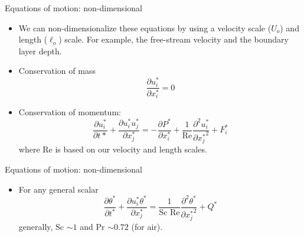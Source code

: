 \begin{frame}{Equations of motion: non-dimensional}

\begin{itemize}
	\item We can non-dimensionalize these equations by using a velocity scale ($U_o$) and length ($\ell_o$) scale. For example, the free-stream velocity and the boundary layer depth.
	\item Conservation of mass $$\frac{\partial u_i^*}{\partial x_i^*} = 0$$
	\item Conservation of momentum: $$\frac{\partial u_i^*}{\partial t*} + \frac{\partial u_i^* u_j^*}{\partial x_j^*} = -\frac{\partial P^*}{\partial x_i^*} + \frac{1}{\text{Re}} \frac{\partial^2 u_i^*}{\partial {x^*_j}^2} + F_i^*$$
	where Re is based on our velocity and length scales.
\end{itemize}
\end{frame}

\begin{frame}{Equations of motion: non-dimensional}

\begin{itemize}
	\item For any general scalar
	$$\frac{\partial \theta^*}{\partial t^*} + \frac{\partial u_i^* \theta^*}{\partial x_j^*} = \frac{1}{\text{Sc Re}} \frac{\partial^2 \theta^*}{\partial {x_j^*}^2} + Q^*$$
	generally, Sc $\sim 1$ and Pr $\sim 0.72$ (for air).
\end{itemize}
\end{frame}

